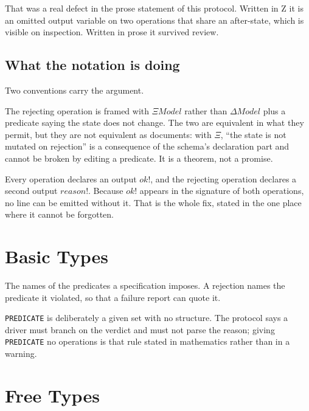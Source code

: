 \documentclass[a4paper,10pt,fleqn]{article}
\begin{document}
That was a real defect in the prose statement of this protocol. Written
in Z it is an omitted output variable on two operations that share an
after-state, which is visible on inspection. Written in prose it survived
review.

\subsection{What the notation is doing}

Two conventions carry the argument.

The rejecting operation is framed with $\Xi Model$ rather than
$\Delta Model$ plus a predicate saying the state does not change. The
two are equivalent in what they permit, but they are not equivalent as
documents: with $\Xi$, ``the state is not mutated on rejection'' is a
consequence of the schema's declaration part and cannot be broken by
editing a predicate. It is a theorem, not a promise.

Every operation declares an output $ok!$, and the rejecting operation
declares a second output $reason!$. Because $ok!$ appears in the
signature of both operations, no line can be emitted without it. That is
the whole fix, stated in the one place where it cannot be forgotten.

\section{Basic Types}

\begin{zed}
  [PREDICATE]
\end{zed}

The names of the predicates a specification imposes. A rejection names
the predicate it violated, so that a failure report can quote it.

\texttt{PREDICATE} is deliberately a given set with no structure. The
protocol says a driver must branch on the verdict and must not parse the
reason; giving \texttt{PREDICATE} no operations is that rule stated in
mathematics rather than in a warning.

\section{Free Types}
\end{document}
